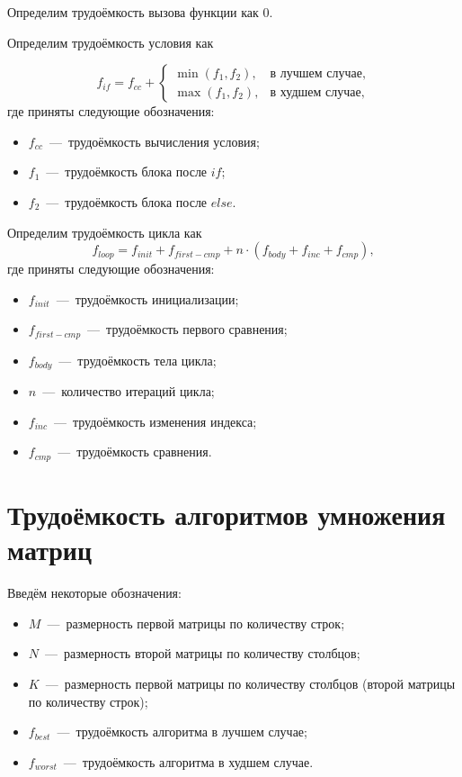 Определим трудоёмкость вызова функции как $0$.

Определим трудоёмкость условия как

\begin{equation}
	f_{if} = f_{cc} + \begin{cases}
		\min(f_1, f_2),& \text{в лучшем случае}, \\
		\max(f_1, f_2),& \text{в худшем случае},
	\end{cases}
\end{equation}
где приняты следующие обозначения:
\begin{itemize}
	\item $f_{cc}$~---~трудоёмкость вычисления условия;
	\item $f_1$~---~трудоёмкость блока после $if$;
	\item $f_2$~---~трудоёмкость блока после $else$.
\end{itemize}

Определим трудоёмкость цикла как
\begin{equation}
	f_{loop} = f_{init} + f_{first-cmp} + n \cdot (f_{body} + f_{inc} + f_{cmp}),
\end{equation}
где приняты следующие обозначения:
\begin{itemize}
	\item $f_{init}$~---~трудоёмкость инициализации;
	\item $f_{first-cmp}$~---~трудоёмкость первого сравнения;
	\item $f_{body}$~---~трудоёмкость тела цикла;
	\item $n$~---~количество итераций цикла;
	\item $f_{inc}$~---~трудоёмкость изменения индекса;
	\item $f_{cmp}$~---~трудоёмкость сравнения.
\end{itemize}

\section{Трудоёмкость алгоритмов умножения матриц}
Введём некоторые обозначения:
\begin{itemize}
	\item $M$~---~размерность первой матрицы по количеству строк;
	\item $N$~---~размерность второй матрицы по количеству столбцов;
	\item $K$~---~размерность первой матрицы по количеству столбцов (второй матрицы по количеству строк);
	\item $f_{best}$~---~трудоёмкость алгоритма в лучшем случае;
	\item $f_{worst}$~---~трудоёмкость алгоритма в худшем случае.
\end{itemize}

